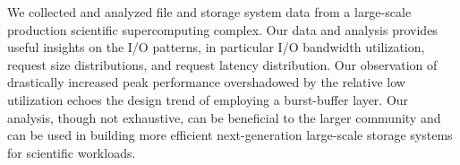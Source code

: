 
We collected and analyzed file and storage system data from a large-scale
production scientific supercomputing complex. Our data and analysis provides
useful insights on the I/O patterns, in particular I/O bandwidth utilization,
request size distributions, and request latency distribution. Our observation of
drastically increased peak performance overshadowed by the relative low
utilization echoes the design trend of employing a burst-buffer layer. Our
analysis, though not exhaustive, can be beneficial to the
larger community and can be used in building more efficient next-generation
large-scale storage systems for scientific workloads.
